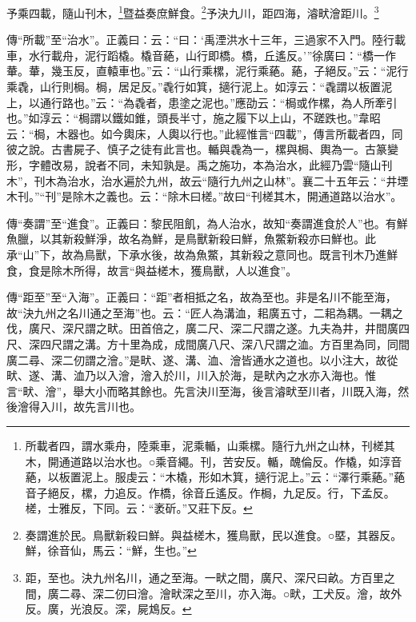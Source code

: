 予乘四載，隨山刊木，\footnote{所載者四，謂水乘舟，陸乘車，泥乘輴，山乘樏。隨行九州之山林，刊槎其木，開通道路以治水也。○乘音繩。刊，苦安反。輴，醜倫反。作橇，如淳音蕝，以板置泥上。服虔云：“木橇，形如木箕，擿行泥上。”云：“澤行乘蕝。”蕝音子絕反，樏，力追反。作橋，徐音丘遙反。作梮，九足反。行，下孟反。槎，士雅反，下同。云：“袤斫。”又莊下反。}暨益奏庶鮮食。\footnote{奏謂進於民。鳥獸新殺曰鮮。與益槎木，獲鳥獸，民以進食。○塈，其器反。鮮，徐音仙，馬云：“鮮，生也。”}予決九川，距四海，濬畎澮距川。\footnote{距，至也。決九州名川，通之至海。一畎之間，廣尺、深尺曰畝。方百里之間，廣二尋、深二仞曰澮。澮畎深之至川，亦入海。○畎，工犬反。澮，故外反。廣，光浪反。深，屍鴆反。}


{\noindent\zhuan{}\fzbyks 傳“所載”至“治水”。正義曰：云：“曰：‘禹湮洪水十三年，三過家不入門。陸行載車，水行載舟，泥行蹈橇。橇音蕝，山行即橋。橋，丘遙反。’”徐廣曰：“橋一作輂。輂，幾玉反，直轅車也。”云：“山行乘樏，泥行乘蕝。蕝，子絕反。”云：“泥行乘毳，山行則梮。梮，居足反。”毳行如箕，擿行泥上。如淳云：“毳謂以板置泥上，以通行路也。”云：“為毳者，患塗之泥也。”應劭云：“梮或作樏，為人所牽引也。”如淳云：“梮謂以鐵如錐，頭長半寸，施之履下以上山，不蹉跌也。”韋昭云：“梮，木器也。如今輿床，人輿以行也。”此經惟言“四載”，傳言所載者四，同彼之說。古書屍子、慎子之徒有此言也。輴與毳為一，樏與梮、輿為一。古篆變形，字體改易，說者不同，未知孰是。禹之施功，本為治水，此經乃雲“隨山刊木”，刊木為治水，治水遍於九州，故云“隨行九州之山林”。襄二十五年云：“井堙木刊。”“刊”是除木之義也。云：“除木曰槎。”故曰“刊槎其木，開通道路以治水”。\par}

{\noindent\zhuan{}\fzbyks 傳“奏謂”至“進食”。正義曰：黎民阻飢，為人治水，故知“奏謂進食於人”也。有鮮魚臘，以其新殺鮮淨，故名為鮮，是鳥獸新殺曰鮮，魚鱉新殺亦曰鮮也。此承“山”下，故為鳥獸，下承水後，故為魚鱉，其新殺之意同也。既言刊木乃進鮮食，食是除木所得，故言“與益槎木，獲鳥獸，人以進食”。 \par}

{\noindent\zhuan{}\fzbyks 傳“距至”至“入海”。正義曰：“距”者相抵之名，故為至也。非是名川不能至海，故“決九州之名川通之至海”也。云：“匠人為溝洫，耜廣五寸，二耜為耦。一耦之伐，廣尺、深尺謂之畎。田首倍之，廣二尺、深二尺謂之遂。九夫為井，井間廣四尺、深四尺謂之溝。方十里為成，成間廣八尺、深八尺謂之洫。方百里為同，同間廣二尋、深二仞謂之澮。”是畎、遂、溝、洫、澮皆通水之道也。以小注大，故從畎、遂、溝、洫乃以入澮，澮入於川，川入於海，是畎內之水亦入海也。惟言“畎、澮”，舉大小而略其餘也。先言決川至海，後言濬畎至川者，川既入海，然後澮得入川，故先言川也。 \par}


